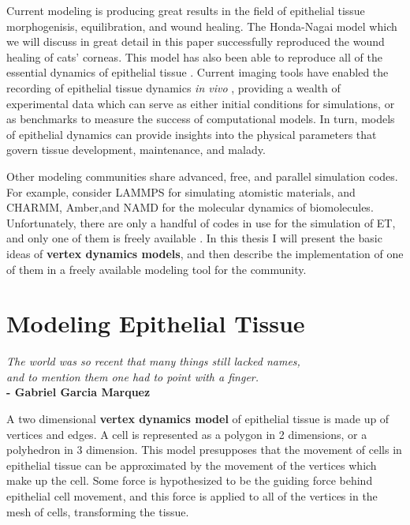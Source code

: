 Current modeling is producing great results in the field of epithelial tissue morphogenisis, equilibration, and wound healing. The Honda-Nagai model which we will discuss in great detail in this paper successfully reproduced the wound healing of cats' corneas\cite{WoundHealing}. This model has also been able to reproduce all of the essential dynamics of epithelial tissue \cite{HondaNagai}.  Current imaging tools have enabled the recording of epithelial tissue dynamics \emph{in vivo} \cite{Solokow}\cite{Xiong}, providing a wealth of experimental data which can serve as either initial conditions for simulations, or as benchmarks to measure the success of computational models. In turn, models of epithelial dynamics can provide insights into the physical parameters that govern tissue development, maintenance, and malady.

Other modeling communities share advanced, free, and parallel simulation codes. For example, consider LAMMPS for simulating atomistic materials, and CHARMM, Amber,and NAMD for the molecular dynamics of biomolecules. Unfortunately, there are only a handful of codes in use for the simulation of ET, and only one of them is freely available \cite{ChasteMain}. In this thesis I will present the basic ideas of \textbf{vertex dynamics models}, and then describe the implementation of one of them in a freely available modeling tool for the community.

\section{Modeling Epithelial Tissue} 
\label{sec:modeling}

\begin{center}
\emph{The world was so recent that many things still lacked names,}\\
\emph{and to mention them one had to point with a finger. }\\
\textbf{\hspace{10ex} - Gabriel Garcia Marquez}
\end{center}

A two dimensional \textbf{vertex dynamics model} of epithelial tissue is made up of vertices and edges\cite{DirichletDomains}. A cell is represented as a polygon in 2 dimensions, or a polyhedron in 3 dimension. This model presupposes that the movement of cells in epithelial tissue can be approximated by the movement of the vertices which make up the cell. Some force is hypothesized to be the guiding force behind epithelial cell movement, and this force is applied to all of the vertices in the mesh of cells, transforming the tissue.


